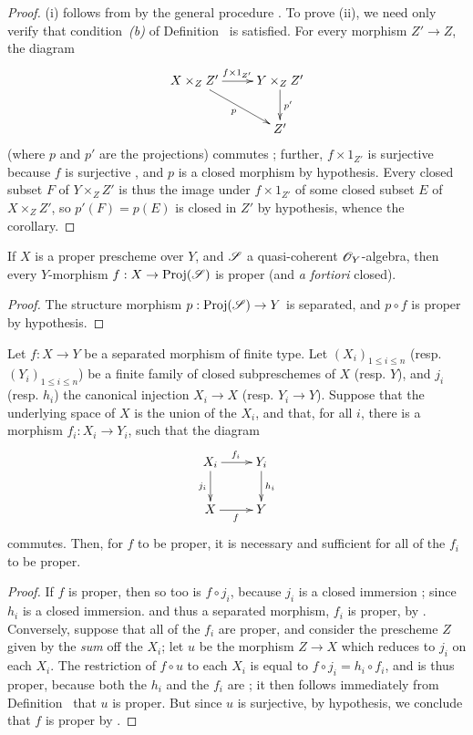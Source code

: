 \begin{proof}
\label{proof-2.5.4.3}
(i) follows from  by the general procedure .
To prove (ii), we need only verify that condition~\emph{(b)} of Definition~ is satisfied.
For every morphism $Z'\to Z$, the diagram
\[
  \xymatrix{
    X\times_Z Z' \ar[r]^{f\times1_{Z'}} \ar[dr]_p
    & Y\times_Z Z' \ar[d]^{p'}\\
    & Z'
  }
\]
(where $p$ and $p'$ are the projections) commutes ;
further, $f\times1_{Z'}$ is surjective because $f$ is surjective , and $p$ is a closed morphism by hypothesis.
Every closed subset $F$ of $Y\times_Z Z'$ is thus the image under $f\times1_{Z'}$ of some closed subset $E$ of $X\times_Z Z'$, so $p'(F)=p(E)$ is closed in $Z'$ by hypothesis, whence the corollary.
\end{proof}

\begin{cor}[5.4.4]
\label{2.5.4.4}
If $X$ is a proper prescheme over $Y$, and $\mathscr{S}$ a quasi-coherent $\mathscr{O}_Y$-algebra, then every $Y$-morphism $f:X\to\Proj(\sh{S})$ is proper (and \emph{a fortiori} closed).
\end{cor}

\begin{proof}
\label{proof-2.5.4.4}
The structure morphism $p:\Proj(\sh{S})\to Y$ is separated, and $p\circ f$ is proper by hypothesis.
\end{proof}

\begin{cor}[5.4.5]
\label{2.5.4.5}
Let $f:X\to Y$ be a separated morphism of finite type.
Let $(X_i)_{1\leq i\leq n}$ (resp. $(Y_i)_{1\leq i\leq n}$) be a finite family of closed subpreschemes of $X$ (resp. $Y$), and $j_i$ (resp. $h_i$) the canonical injection $X_i\to X$ (resp. $Y_i\to Y$).
Suppose that the underlying space of $X$ is the union of the $X_i$, and that, for all $i$, there is a morphism $f_i:X_i\to Y_i$, such that the diagram
\[
  \xymatrix{
    X_i \ar[r]^{f_i} \ar[d]_{j_i}
    & Y_i \ar[d]^{h_i}\\
    X \ar[r]_f
    & Y
  }
\]
commutes.
Then, for $f$ to be proper, it is necessary and sufficient for all of the $f_i$ to be proper.
\end{cor}

\begin{proof}
\label{proof-2.5.4.5}
If $f$ is proper, then so too is $f\circ j_i$, because $j_i$ is a closed immersion ;
since $h_i$ is a closed immersion. and thus a separated morphism, $f_i$ is proper, by .
Conversely, suppose that all of the $f_i$ are proper, and consider the prescheme $Z$ given by the \emph{sum} off the $X_i$;
let $u$ be the morphism $Z\to X$ which reduces to $j_i$ on each $X_i$.
The restriction of $f\circ u$ to each $X_i$ is equal to $f\circ j_i=h_i\circ f_i$, and is thus proper, because both the $h_i$ and the $f_i$ are ;
it then follows immediately from Definition~ that $u$ is proper.
But since $u$ is surjective, by hypothesis, we conclude that $f$ is proper by .
\end{proof}

